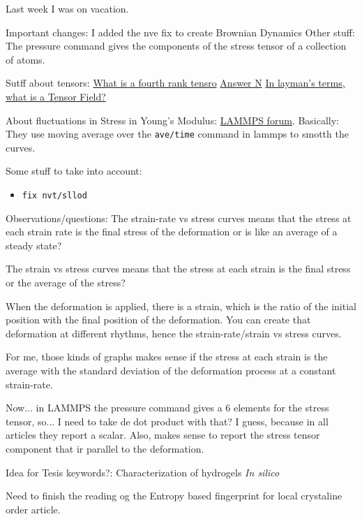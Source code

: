 \documentclass[a4paper, 11pt, oneside]{researchjournal} %
\begin{document}

Last week I was on vacation.

Important changes: I added the nve fix to create Brownian Dynamics
Other stuff: The pressure command gives the components of the stress tensor of a collection of atoms.

Sutff about tensors: 
\href{https://www.quora.com/What-is-a-fourth-rank-tensor}{What is a fourth rank tensro} 
\href{https://www.quora.com/?signup_answer_page=17479694}{Answer N}
\href{https://www.quora.com/In-laymans-terms-what-is-a-Tensor-Field}{In layman's terms, what is a Tensor Field?}

About fluctuations in Stress in Young's Modulus: \href{https://matsci.org/t/fluctuations-in-stress-youngs-modulus/33483}{LAMMPS forum}.
Basically: They use moving average over the \verb|ave/time| command in lammps to smotth the curves.


Some stuff to take into account:
\begin{itemize}
	\item \verb|fix nvt/sllod|
\end{itemize}

Observations/questions:
The strain-rate vs stress curves means that the stress at each strain rate is the final stress of the deformation or is like an average of a steady state?

The strain vs stress curves means that the stress at each strain is the final stress or the average of the stress?

When the deformation is applied, there is a strain, which is the ratio of the initial position with the final position of the deformation.
You can create that deformation at different rhythms, hence the strain-rate/strain vs stress curves.

For me, those kinds of graphs makes sense if the stress at each strain is the average with the standard deviation of the deformation process at a constant strain-rate.

Now... in LAMMPS the pressure command gives a 6 elements for the stress tensor, so... I need to take de dot product with that?
I guess, because in all articles they report a scalar.
Also, makes sense to report the stress tensor component that ir parallel to the deformation.


Idea for Tesis keywords?: Characterization of hydrogels \textit{In silico}

Need to finish the reading og the Entropy based fingerprint for local crystaline order article.
\end{document}
